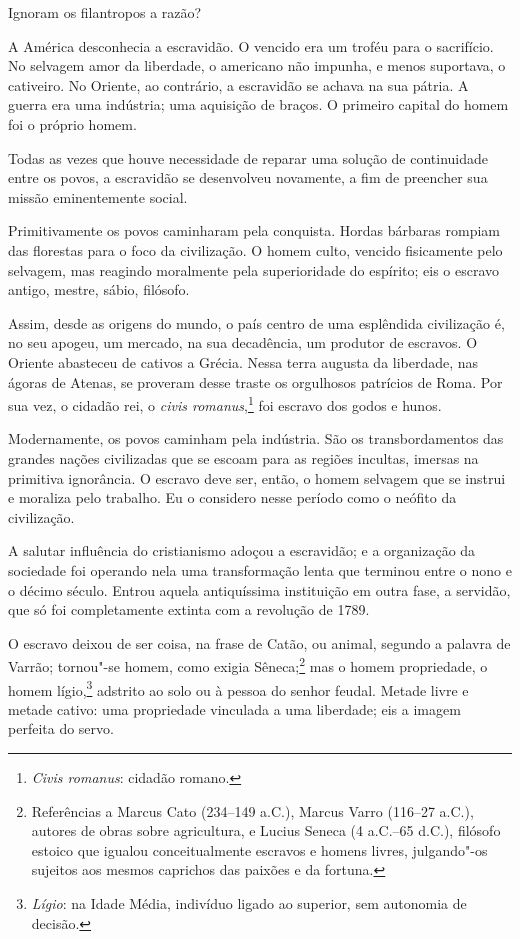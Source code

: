 Ignoram os filantropos a razão?

A América desconhecia a escravidão. O vencido era um troféu para o
sacrifício. No selvagem amor da liberdade, o americano não impunha, e
menos suportava, o cativeiro. No Oriente, ao contrário, a escravidão se
achava na sua pátria. A guerra era uma indústria; uma aquisição de
braços. O primeiro capital do homem foi o próprio homem.

Todas as vezes que houve necessidade de reparar uma solução de
continuidade entre os povos, a escravidão se desenvolveu novamente,
a fim de preencher sua missão eminentemente social. 

Primitivamente os povos caminharam pela conquista. Hordas bárbaras
rompiam das florestas para o foco da civilização. O homem culto,
vencido fisicamente pelo selvagem, mas reagindo moralmente pela
superioridade do espírito; eis o escravo antigo, mestre, sábio, filósofo. 

Assim, desde as origens do mundo, o país centro de uma esplêndida \label{origem}
civilização é, no seu apogeu, um mercado, na sua decadência, um
produtor de escravos. O Oriente abasteceu de cativos a Grécia. Nessa
terra augusta da liberdade, nas ágoras de Atenas, se proveram desse
traste os orgulhosos patrícios de Roma. Por sua vez, o cidadão rei, o
\textit{civis romanus},\footnote{ \textit{Civis romanus}: cidadão romano.}
 foi escravo dos godos e hunos. 

Modernamente, os povos caminham pela indústria. São os transbordamentos
das grandes nações civilizadas que se escoam para as regiões incultas,
imersas na primitiva ignorância. O escravo deve ser, então, o homem 	\label{cultura}
selvagem que se instrui e moraliza pelo trabalho. Eu o considero nesse
período como o neófito da civilização.

 A salutar influência do cristianismo adoçou a escravidão; e a
organização da sociedade foi operando nela uma transformação lenta que
terminou entre o nono e o décimo século. Entrou aquela antiquíssima
instituição em outra fase, a servidão, que só foi completamente extinta
com a revolução de 1789. 

O escravo deixou de ser coisa, na frase de Catão, ou animal, segundo a
palavra de Varrão; tornou"-se homem, como exigia
Sêneca;\footnote{ Referências a Marcus Cato (234--149 a.C.), Marcus 
Varro (116--27 a.C.), autores de obras sobre agricultura, e
Lucius Seneca (4 a.C.--65 d.C.), filósofo estoico que igualou conceitualmente escravos 
e homens livres, julgando"-os sujeitos aos mesmos caprichos das paixões e da fortuna.} 
mas o homem propriedade, o homem lígio,\footnote{ \textit{Lígio}: na Idade Média, indivíduo 
ligado ao superior, sem autonomia de decisão.}
 adstrito ao solo ou à pessoa do senhor feudal. Metade livre e metade
cativo: uma propriedade vinculada a uma liberdade; eis a imagem perfeita do servo. 

